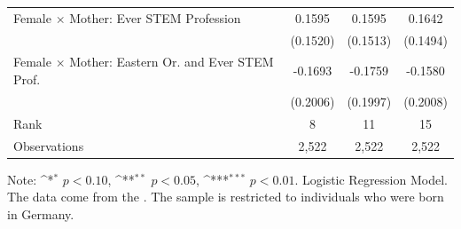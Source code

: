 \documentclass[a4paper, oneside, hyperfootnotes = false]{article}
\def\sym#1{\ifmmode^{#1}\else\(^{#1}\)\fi}
\begin{document}
{\begin{table}[ht]
\begin{center}
\begin{tabular}{l*{3}{c}}
			\addlinespace
			Female $\times$ Mother: Ever STEM Profession&      0.1595         &      0.1595         &      0.1642         \\
			&    (0.1520)         &    (0.1513)         &    (0.1494)         \\
			\addlinespace
			Female $\times$ Mother: Eastern Or. and Ever STEM Prof. &     -0.1693         &     -0.1759         &     -0.1580         \\
			&    (0.2006)         &    (0.1997)         &    (0.2008)         \\
			\midrule
			Rank                &      8         &     11         &     15         \\
			Observations                   &   2,522         &   2,522         &   2,522         \\
			\bottomrule
		\end{tabular}
		
		\vspace{2mm}
		
		\parbox{10cm}{
			\linespread{1}\footnotesize Note: \sym{*} \(p<0.10\), \sym{**} \(p<0.05\), \sym{***} \(p<0.01\). Logistic Regression Model. The data come from the \cite{SOEP2023}. The sample is restricted to individuals who were born in Germany.}
		
	\end{center}
\end{table}

}
\end{document}
